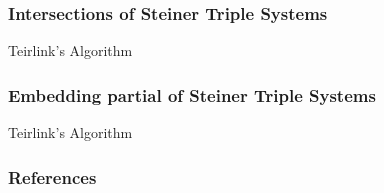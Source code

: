 \documentclass{beamer}
\begin{document}
	\begin{frame}
	\frametitle{Intersections of Steiner Triple Systems}
	Teirlink's Algorithm %
	\end{frame}
	\begin{frame}
	\frametitle{Embedding partial of Steiner Triple Systems}
	Teirlink's Algorithm %
	\end{frame}

	
	\begin{frame}[t,allowframebreaks]
	\frametitle{References}
	\printbibliography
	\end{frame}
\end{document}

